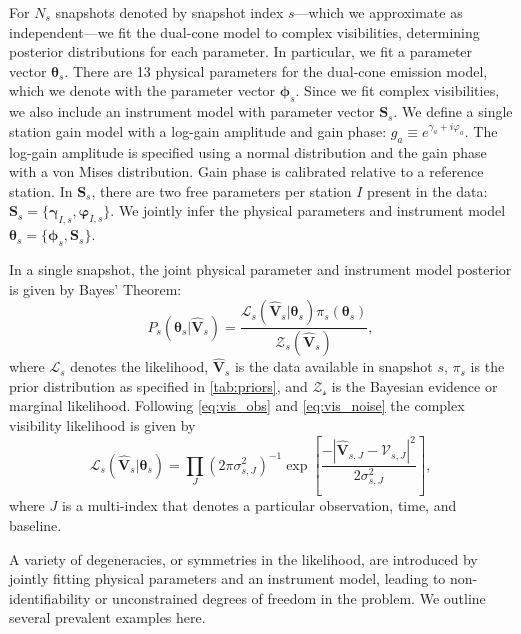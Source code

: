 \documentclass[linenumbers, twocolumn, tighten]{aastex701}
\begin{document}
For $N_s$ snapshots denoted by snapshot index $s$---which we approximate as independent---we fit the dual-cone model to complex visibilities, determining posterior distributions for each parameter. In particular, we fit a parameter vector $\boldsymbol{\theta}_s$. There are 13 physical parameters for the dual-cone emission model, which we denote with the parameter vector $\boldsymbol{\phi}_s$. Since we fit complex visibilities, we also include an instrument model with parameter vector $\boldsymbol{S}_s$. We define a single station gain model with a log-gain amplitude and gain phase: $g_a \equiv e^{\gamma_a + i\varphi_a}$. The log-gain amplitude is specified using a normal distribution and the gain phase with a von Mises distribution. Gain phase is calibrated relative to a reference station. %
In $\boldsymbol{S}_s$, there are two free parameters per station $I$ present in the data: $\boldsymbol{S}_s = \{\boldsymbol{\gamma}_{I,s},  \boldsymbol{\varphi}_{I,s}\}$. We jointly infer the physical parameters and instrument model $\boldsymbol{\theta}_s = \{ \boldsymbol{\phi}_s, \boldsymbol{S}_s \}$.

In a single snapshot, the joint physical parameter and instrument model posterior is given by Bayes' Theorem:
\begin{equation}
    P_s(\boldsymbol{\theta}_s | \boldsymbol{\hat{V}}_s) = \frac{\mathcal{L}_s(\boldsymbol{\hat{V}}_s|\boldsymbol{\theta}_s)\pi_s(\boldsymbol{\theta}_s)}{\mathcal{Z}_s(\boldsymbol{\hat{V}}_s)},
\end{equation}
where $\mathcal{L}_s$ denotes the likelihood, $\boldsymbol{\hat{V}}_s$ is the data available in snapshot $s$, $\pi_s$ is the prior distribution as specified in \autoref{tab:priors}, and $\mathcal{Z_s}$ is the Bayesian evidence or marginal likelihood. Following \autoref{eq:vis_obs} and \autoref{eq:vis_noise} the complex visibility likelihood is given by
\begin{equation}
    \mathcal{L}_s(\boldsymbol{\hat{V}}_s|\boldsymbol{\theta}_s) = \prod_J (2\pi \sigma^2_{s,J})^{-1} \exp[\frac{-|\boldsymbol{\hat{V}}_{s,J}-\mathcal{V}_{s,J}|^2}{2\sigma^2_{s,J}}],
\end{equation}
where $J$ is a multi-index that denotes a particular observation, time, and baseline.

A variety of degeneracies, or symmetries in the likelihood, are introduced by jointly fitting physical parameters and an instrument model, leading to non-identifiability or unconstrained degrees of freedom in the problem. We outline several prevalent examples here. 
\end{document}
